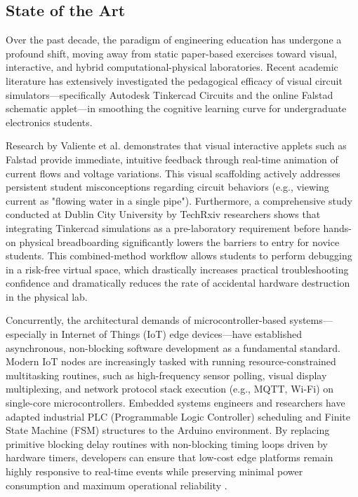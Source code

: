 
\subsection{State of the Art}

Over the past decade, the paradigm of engineering education has undergone a profound shift, moving away from static paper-based exercises toward visual, interactive, and hybrid computational-physical laboratories. Recent academic literature has extensively investigated the pedagogical efficacy of visual circuit simulators—specifically Autodesk Tinkercad Circuits and the online Falstad schematic applet—in smoothing the cognitive learning curve for undergraduate electronics students. 

Research by Valiente et al. \cite{valiente2019} demonstrates that visual interactive applets such as Falstad provide immediate, intuitive feedback through real-time animation of current flows and voltage variations. This visual scaffolding actively addresses persistent student misconceptions regarding circuit behaviors (e.g., viewing current as "flowing water in a single pipe"). Furthermore, a comprehensive study conducted at Dublin City University by TechRxiv researchers \cite{ridgway2024} shows that integrating Tinkercad simulations as a pre-laboratory requirement before hands-on physical breadboarding significantly lowers the barriers to entry for novice students. This combined-method workflow allows students to perform debugging in a risk-free virtual space, which drastically increases practical troubleshooting confidence and dramatically reduces the rate of accidental hardware destruction in the physical lab.

Concurrently, the architectural demands of microcontroller-based systems—especially in Internet of Things (IoT) edge devices—have established asynchronous, non-blocking software development as a fundamental standard. Modern IoT nodes are increasingly tasked with running resource-constrained multitasking routines, such as high-frequency sensor polling, visual display multiplexing, and network protocol stack execution (e.g., MQTT, Wi-Fi) on single-core microcontrollers. Embedded systems engineers and researchers have adapted industrial PLC (Programmable Logic Controller) scheduling and Finite State Machine (FSM) structures to the Arduino environment. By replacing primitive blocking delay routines with non-blocking timing loops driven by hardware timers, developers can ensure that low-cost edge platforms remain highly responsive to real-time events while preserving minimal power consumption and maximum operational reliability \cite{dahlen2023, achary2025}.

